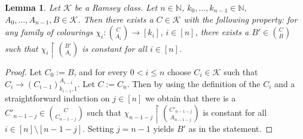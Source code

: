 \documentclass[12pt]{amsart}
\theoremstyle{plain}
\newtheorem{lemma}[theorem]{Lemma}
\theoremstyle{definition}
\begin{document}
\begin{lemma}\label{lem:ramseyref}
Let ${\mathcal K}$ be a Ramsey class. Let $n\in \mathbb{N}$, $k_0, \ldots, k_{n-1}\in\mathbb{N}$, $A_0, \ldots, A_{n-1} , B\in {\mathcal K}$. 
Then there exists a $C\in {\mathcal K}$ with the following property: for any family of
colourings $\chi_i: \binom{C}{A_i}\rightarrow [k_i]$, $i\in [n]$, there
 exists a $B'\in \binom{C}{B}$ such that 
$\chi_i\upharpoonright\binom{B'}{A_i}$ 
is constant for all $i\in [n]$.
\end{lemma}
\begin{proof}
Let $C_0:= B$, and for every $0<i\le n$ choose $C_i\in{\mathcal K}$ such that
$C_i\to (C_{i-1})_{k_{i-1},1}^{A_{i-1}}$. Let $C:= C_n$. Then by using the definition of the $C_i$ and a 
straightforward induction on $j\in [n]$ we obtain that there is a $C'_{n-1-j}\in \binom{C}{C_{n-1-j}}$ such that 
$\chi_{n-1-j}\upharpoonright \binom{C'_{n-1-j}}{A_{n-1-j}}$ 
is constant for all $i\in [n]\setminus [n-1-j]$. Setting $j= n-1$ yields $B'$ as in the statement. 
\end{proof}
\end{document}
